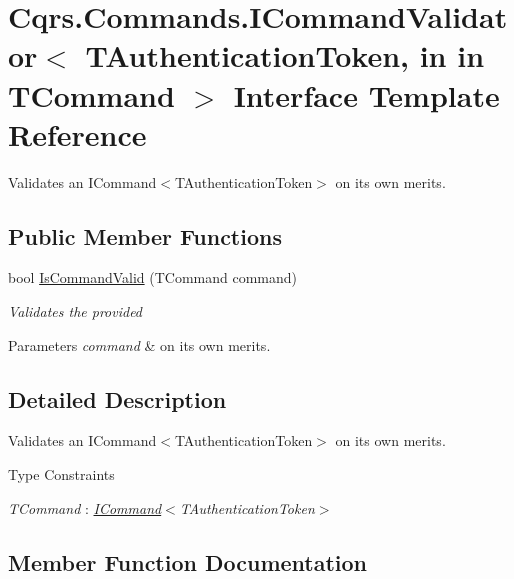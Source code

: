 \hypertarget{interfaceCqrs_1_1Commands_1_1ICommandValidator}{}\section{Cqrs.\+Commands.\+I\+Command\+Validator$<$ T\+Authentication\+Token, in in T\+Command $>$ Interface Template Reference}
\label{interfaceCqrs_1_1Commands_1_1ICommandValidator}


Validates an I\+Command$<$\+T\+Authentication\+Token$>$ on its own merits.  


\subsection*{Public Member Functions}
\begin{DoxyCompactItemize}
\item 
bool \hyperlink{interfaceCqrs_1_1Commands_1_1ICommandValidator_a8ac558179848dcb0ee56d2c3e7ad8cd9}{Is\+Command\+Valid} (T\+Command command)
\begin{DoxyCompactList}\small\item\em Validates the provided 
\begin{DoxyParams}{Parameters}
{\em command} & on its own merits. \\
\hline
\end{DoxyParams}
\end{DoxyCompactList}\end{DoxyCompactItemize}


\subsection{Detailed Description}
Validates an I\+Command$<$\+T\+Authentication\+Token$>$ on its own merits. 

\begin{Desc}
\item[Type Constraints]\begin{description}
\item[{\em T\+Command} : {\em \hyperlink{interfaceCqrs_1_1Commands_1_1ICommand}{I\+Command}$<$T\+Authentication\+Token$>$}]\end{description}
\end{Desc}


\subsection{Member Function Documentation}
\mbox{\label{interfaceCqrs_1_1Commands_1_1ICommandValidator_a8ac558179848dcb0ee56d2c3e7ad8cd9}} 
